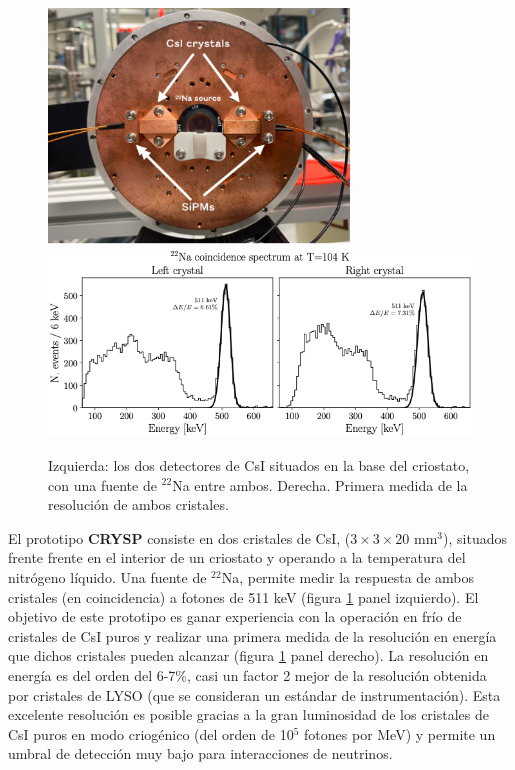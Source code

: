 \documentclass[12pt,a4paper,article]{report} %
\def\crysp{{\bf CRYSP }}
\begin{document}
\begin{figure}[bht!]
\begin{center}
\includegraphics[width=8cm]{img/cryo0.png}
\includegraphics[width=12cm]{img/eres.png}
\caption{Izquierda: los dos detectores de CsI situados en la base del criostato, con una fuente de ${}^{22}$Na entre ambos. Derecha. Primera medida de la resolución de ambos cristales.}
\label{fig:crysp}
\end{center}
\end{figure}


El prototipo \crysp consiste en dos cristales de CsI, ($3\times 3 \times 20$ mm$^3$), situados frente frente en el interior de un criostato y operando a la temperatura del nitrógeno líquido. Una fuente de ${}^{22}$Na, permite medir la respuesta de ambos cristales (en coincidencia) a fotones de 511 keV (figura \ref{fig:crysp} panel izquierdo). El objetivo de este prototipo es ganar experiencia con la operación en frío de cristales de
CsI puros y realizar una primera medida de la resolución en energía que dichos cristales pueden alcanzar (figura \ref{fig:crysp} panel derecho). La resolución en energía es del orden del 6-7\%, casi un factor 2 mejor de la resolución obtenida por cristales de LYSO (que se consideran un estándar de instrumentación). Esta excelente resolución es posible gracias a la gran luminosidad de los cristales de CsI puros en modo criogénico (del orden de 10$^5$ fotones por MeV) y permite un umbral de detección muy bajo para interacciones de neutrinos.
\end{document}

